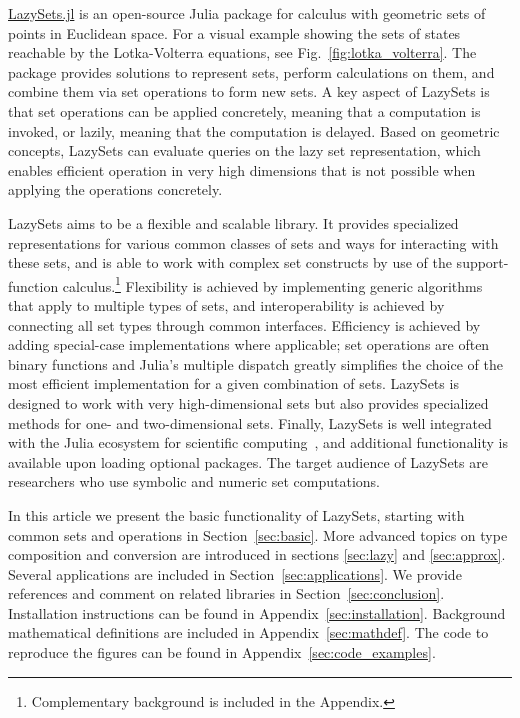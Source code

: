 \href{https://github.com/JuliaReach/LazySets.jl}{LazySets.jl} is an open-source Julia package for calculus with geometric sets of points in Euclidean space. For a visual example showing the sets of states reachable by the Lotka-Volterra equations, see Fig.~\ref{fig:lotka_volterra}.
%
The package provides solutions to represent sets, perform calculations on them, and combine them via set operations to form new sets.
%
A key aspect of LazySets is that set operations can be applied concretely, meaning that a computation is invoked, or lazily, meaning that the computation is delayed.
%
Based on geometric concepts, LazySets can evaluate queries on the lazy set representation, which enables efficient operation in very high dimensions that is not possible when applying the operations concretely.

\smallskip

LazySets aims to be a flexible and scalable library.
%
It provides specialized representations for various common classes of sets and ways for interacting with these sets, and is able to work with complex set constructs by use of the support-function calculus.\footnote{Complementary background is included in the Appendix.}
%
Flexibility is achieved by implementing generic algorithms that apply to multiple types of sets, and interoperability is achieved by connecting all set types through common interfaces.
%
Efficiency is achieved by adding special-case implementations where applicable; set operations are often binary functions and Julia's multiple dispatch greatly simplifies the choice of the most efficient implementation for a given combination of sets.
%
LazySets is designed to work with very high-dimensional sets but also provides specialized methods for one- and two-dimensional sets.
%
Finally, LazySets is well integrated with the Julia ecosystem for scientific computing~\cite{bezanson2017julia}, and additional functionality is available upon loading optional packages.
%
The target audience of LazySets are researchers who use symbolic and numeric set computations.

\smallskip

In this article we present the basic functionality of LazySets, starting with common sets and operations in Section~\ref{sec:basic}.
%
More advanced topics on type composition and conversion are introduced in sections \ref{sec:lazy} and \ref{sec:approx}.
%
Several applications are included in Section~\ref{sec:applications}.
%
We provide references and comment on related libraries in Section~\ref{sec:conclusion}.
%
Installation instructions can be found in Appendix~\ref{sec:installation}.
%
Background mathematical definitions are included in Appendix~\ref{sec:mathdef}.
%
The code to reproduce the figures can be found in Appendix~\ref{sec:code_examples}.


